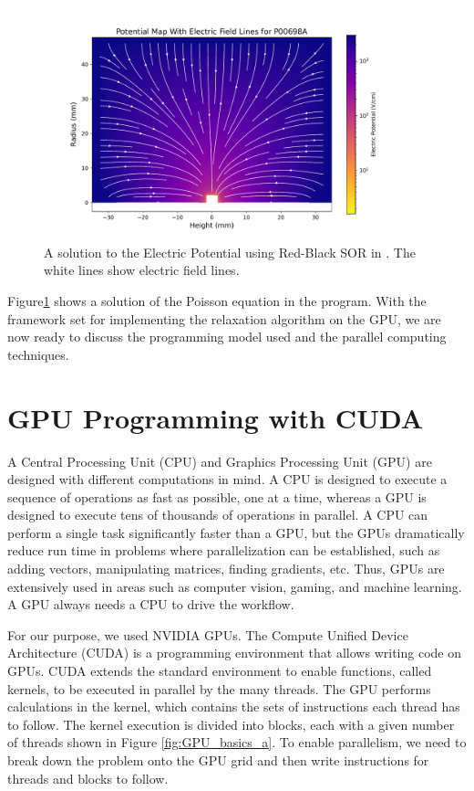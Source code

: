 \begin{figure}[!htb]
\centering
 \includegraphics[width=\linewidth]{ch4/figs/elect_pot_P00698A.pdf}
\caption{\label{fig:sor_pot_sol} A solution to the Electric Potential using Red-Black SOR in {\ehd}. The white lines show electric field lines.}
\label{ch4:fig:elect_pot_soln}
\end{figure}

Figure\ref{ch4:fig:elect_pot_soln} shows a solution of the Poisson equation in the program. With the framework set for implementing the relaxation algorithm on the GPU, we are now ready to discuss the programming model used and the parallel computing techniques.


\section{GPU Programming with CUDA {\cpp} }

A Central Processing Unit (CPU) and Graphics Processing Unit (GPU) are designed with different computations in mind. A CPU is designed to execute a sequence of operations as fast as possible, one at a time, whereas a GPU is designed to execute tens of thousands of operations in parallel. A CPU can perform a single task significantly faster than a GPU, but the GPUs dramatically reduce run time in problems where parallelization can be established, such as adding vectors, manipulating matrices, finding gradients, etc. Thus, GPUs are extensively used in areas such as computer vision, gaming, and machine learning. A GPU always needs a CPU to drive the workflow. 

For our purpose, we used NVIDIA GPUs. The Compute Unified Device Architecture (CUDA) is a programming environment that allows writing {\cpp} code on GPUs. CUDA extends the standard {\cpp} environment to enable functions, called kernels, to be executed in parallel by the many threads. The GPU performs calculations in the kernel, which contains the sets of instructions each thread has to follow. The kernel execution is divided into blocks, each with a given number of threads shown in Figure \ref{fig:GPU_basics_a}. To enable parallelism, we need to break down the problem onto the GPU grid and then write instructions for threads and blocks to follow.

